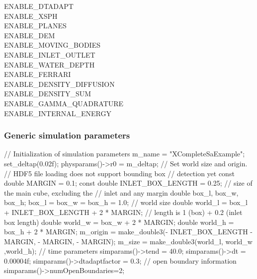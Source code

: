 \begin{enumerate}
ENABLE\_DTADAPT \\
ENABLE\_XSPH \\
ENABLE\_PLANES \\
ENABLE\_DEM \\
ENABLE\_MOVING\_BODIES \\
ENABLE\_INLET\_OUTLET \\
ENABLE\_WATER\_DEPTH \\
ENABLE\_FERRARI \\
ENABLE\_DENSITY\_DIFFUSION \\
ENABLE\_DENSITY\_SUM \\
ENABLE\_GAMMA\_QUADRATURE \\
ENABLE\_INTERNAL\_ENERGY\\
\end{enumerate}

\subsubsection{Generic simulation parameters}

\begin{ccode}
// Initialization of simulation parameters
m_name = "XCompleteSaExample";
set_deltap(0.02f);
physparams()->r0 = m_deltap;
// Set world size and origin.
// HDF5 file loading does not support bounding box 
// detection yet
const double MARGIN = 0.1;
const double INLET_BOX_LENGTH = 0.25;
// size of the main cube, excluding the 
// inlet and any margin
double box_l, box_w, box_h;
box_l = box_w = box_h = 1.0;
// world size
double world_l = box_l + INLET_BOX_LENGTH 
    + 2 * MARGIN; // length is 1 (box) + 0.2 (inlet box length)
double world_w = box_w + 2 * MARGIN;
double world_h = box_h + 2 * MARGIN;
m_origin = make_double3(- INLET_BOX_LENGTH - MARGIN,
    - MARGIN, - MARGIN);
m_size = make_double3(world_l, world_w ,world_h);
// time parameters
simparams()->tend = 40.0;
simparams()->dt = 0.00004f;
simparams()->dtadaptfactor = 0.3;
// open boundary information
simparams()->numOpenBoundaries=2;
\end{ccode}

